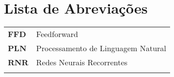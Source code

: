 \chapter{Lista de Abreviações}
\begin{tabular}{ll}
\vspace{3mm}
\textbf{FFD} 		 & Feedforward\\ \vspace{3mm}
\textbf{PLN} 		 & Processamento de Linguagem Natural\\ \vspace{3mm}
\textbf{RNR} 		 & Redes Neurais Recorrentes\\ \vspace{3mm}

\end{tabular}
